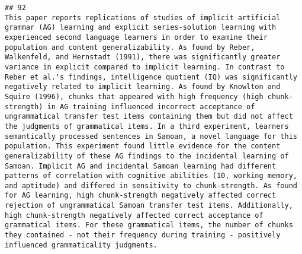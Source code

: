 \documentclass[
  english,
  man]{apa6}
\begin{document}
\begin{verbatim}
## 92                                                                                                                                                                                                                                                                                                                                                                                                                                                                                                                                                                                                                                                                                                                                                                                                                                                                                                                                                                                                                                              This paper reports replications of studies of implicit artificial grammar (AG) learning and explicit series-solution learning with experienced second language learners in order to examine their population and content generalizability. As found by Reber, Walkenfeld, and Hernstadt (1991), there was significantly greater variance in explicit compared to implicit learning. In contrast to Reber et al.'s findings, intelligence quotient (IQ) was significantly negatively related to implicit learning. As found by Knowlton and Squire (1996), chunks that appeared with high frequency (high chunk-strength) in AG training influenced incorrect acceptance of ungrammatical transfer test items containing them but did not affect the judgments of grammatical items. In a third experiment, learners semantically processed sentences in Samoan, a novel language for this population. This experiment found little evidence for the content generalizability of these AG findings to the incidental learning of Samoan. Implicit AG and incidental Samoan learning had different patterns of correlation with cognitive abilities (10, working memory, and aptitude) and differed in sensitivity to chunk-strength. As found for AG learning, high chunk-strength negatively affected correct rejection of ungrammatical Samoan transfer test items. Additionally, high chunk-strength negatively affected correct acceptance of grammatical items. For these grammatical items, the number of chunks they contained - not their frequency during training - positively influenced grammaticality judgments.

\end{verbatim}
\end{document}
